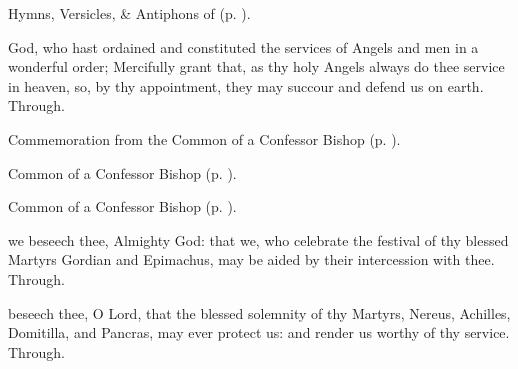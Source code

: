 \begin{rubric}
	Hymns, Versicles, \& Antiphons of  (p. \pageref{Michaelmas}).
\end{rubric}

{} God, who hast ordained and constituted the services of Angels and men in a wonderful order; Mercifully grant that, as thy holy Angels always do thee service in heaven, so, by thy appointment, they may succour and defend us on earth. Through.
\begin{rubric}
	Commemoration  from the Common of a Confessor Bishop (p. \pageref{ConfessorBishopCollect}).
\end{rubric}


\clearpage



\begin{rubric}
	Common of a Confessor Bishop (p. \pageref{ConfessorBishopCollect}).
\end{rubric}



\begin{rubric}
	Common of a Confessor Bishop (p. \pageref{CommonConfessorBishop}).
\end{rubric}




\memorialCollect
{} we beseech thee, Almighty God: that we, who celebrate the festival of thy blessed Martyrs Gordian and Epimachus, may be aided by their intercession with thee. Through.



\memorialCollect
{} beseech thee, O Lord, that the blessed solemnity of thy Martyrs, Nereus, Achilles, Domitilla, and Pancras, may ever protect us: and render us worthy of thy service. Through.


